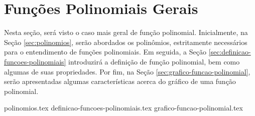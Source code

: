 \section{Funções Polinomiais Gerais}
\label{sec:funcoes-polinomiais-gerais}

Nesta seção, será visto o caso mais geral de função polinomial. 
Inicialmente, na Seção \ref{sec:polinomios}, serão abordados os polinômios, 
estritamente necessários para o entendimento de funções polinomiais.
Em seguida, a Seção \ref{sec:definicao-funcoes-polinomiais} introduzirá 
a definição de função polinomial, bem como algumas de suas propriedades.
Por fim, na Seção \ref{sec:grafico-funcao-polinomial}, serão apresentadas
algumas características acerca do gráfico de uma função polinomial.

{polinomios.tex}
{definicao-funcoes-polinomiais.tex}
{grafico-funcao-polinomial.tex}